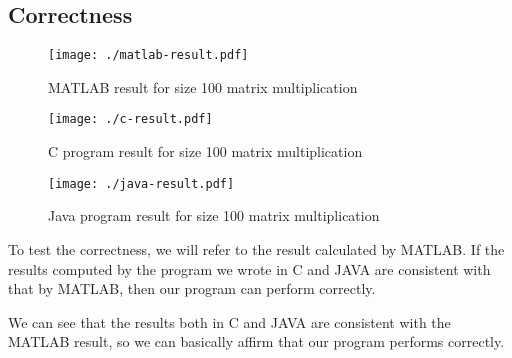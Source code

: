\documentclass[12pt]{article}
\begin{document}
	\subsection{Correctness}
	\begin{figure}[htbp]
		\centering
		\texttt{[image: ./matlab-result.pdf]}
		\caption{MATLAB result for size 100 matrix multiplication}
	\end{figure}
	\begin{figure}[htbp]
		\centering
		\texttt{[image: ./c-result.pdf]}
		\caption{C program result for size 100 matrix multiplication}
	\end{figure}
	\begin{figure}[htbp]
		\centering
		\texttt{[image: ./java-result.pdf]}
		\caption{Java program result for size 100 matrix multiplication}
	\end{figure}
	To test the correctness, we will refer to the result calculated by MATLAB. If the results computed by the program we wrote in C and JAVA are consistent with that by MATLAB, then our program can perform correctly.\par
	We can see that the results both in C and JAVA are consistent with the MATLAB result, so we can basically affirm that our program performs correctly.\par
\end{document}

